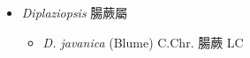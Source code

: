 
  \begin{itemize}
 \item[] \textit{Diplaziopsis} 腸蕨屬
                                
  \begin{itemize}
        \item[] \textit{D. javanica} (Blume) C.Chr.  腸蕨   LC
  \end{itemize}
  \end{itemize}
